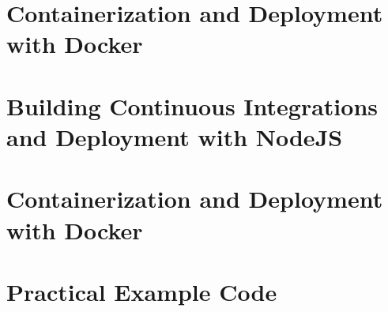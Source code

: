 
\newpage

\section{Containerization and Deployment with Docker}
\label{section:Containerization and Deployment with Docker}


\newpage

\section{Building Continuous Integrations and Deployment with NodeJS}
\label{section:Building Continuous Integrations and Deployment with NodeJS}


\newpage

\section{Containerization and Deployment with Docker}
\label{section:Containerization and Deployment with Docker}


\newpage

\section{Practical Example Code}
\label{section:Practical Example Code}


\newpage








%
%
%
%
%
%
